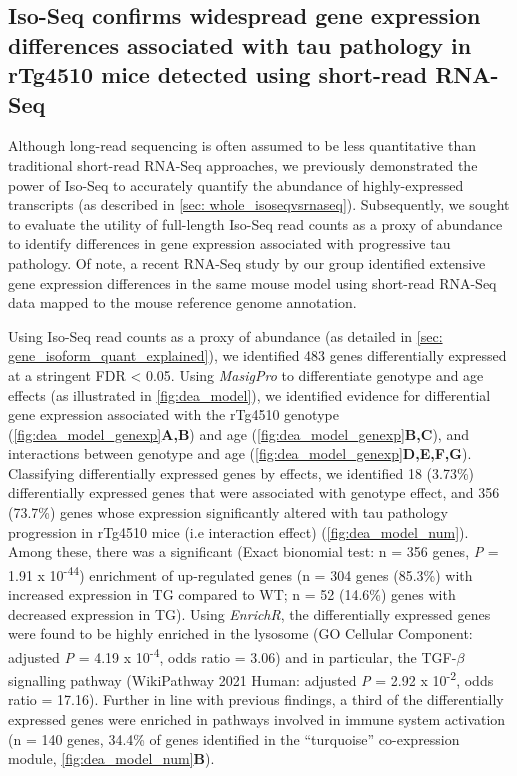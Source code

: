 \subsection{Iso-Seq confirms widespread gene expression differences associated with tau pathology in rTg4510 mice detected using short-read RNA-Seq}
\label{ch5: diffgeneexp}
Although long-read sequencing is often assumed to be less quantitative than traditional short-read RNA-Seq approaches, we previously demonstrated the power of Iso-Seq to accurately quantify the abundance of highly-expressed transcripts (as described in \cref{sec: whole_isoseqvsrnaseq}). Subsequently, we sought to evaluate the utility of full-length Iso-Seq read counts as a proxy of abundance to identify differences in gene expression associated with progressive tau pathology. Of note, a recent RNA-Seq study by our group identified extensive gene expression differences in the same mouse model using short-read RNA-Seq data mapped to the mouse reference genome annotation\cite{Castanho2020}.

Using Iso-Seq read counts as a proxy of abundance (as detailed in \cref{sec: gene_isoform_quant_explained}), we identified 483 genes differentially expressed at a stringent FDR < 0.05. Using \textit{MasigPro} to differentiate genotype and age effects (as illustrated in \cref{fig:dea_model}), we identified evidence for differential gene expression associated with the rTg4510 genotype (\cref{fig:dea_model_genexp}\textbf{A,B}) and age (\cref{fig:dea_model_genexp}\textbf{B,C}), and interactions between genotype and age (\cref{fig:dea_model_genexp}\textbf{D,E,F,G}). Classifying differentially expressed genes by effects, we identified 18 (3.73\%) differentially expressed genes that were associated with genotype effect, and 356 (73.7\%) genes whose expression significantly altered with tau pathology progression in rTg4510 mice (i.e interaction effect) (\cref{fig:dea_model_num}). Among these, there was a significant (Exact bionomial test: n = 356 genes, \textit{P} = 1.91 x 10\textsuperscript{-44}) enrichment of up-regulated genes (n = 304 genes (85.3\%) with increased expression in TG compared to WT; n = 52 (14.6\%) genes with decreased expression in TG). Using \textit{EnrichR}, the differentially expressed genes were found to be highly enriched in the lysosome (GO Cellular Component: adjusted \textit{P} = 4.19 x 10\textsuperscript{-4}, odds ratio = 3.06) and in particular, the TGF-$\beta$  signalling pathway (WikiPathway 2021 Human: adjusted \textit{P} = 2.92 x 10\textsuperscript{-2}, odds ratio = 17.16). Further in line with previous findings, a third of the differentially expressed genes were enriched in pathways involved in immune system activation (n = 140 genes, 34.4\% of genes identified in the “turquoise” co-expression module\cite{Castanho2020}, \cref{fig:dea_model_num}\textbf{B}). 

